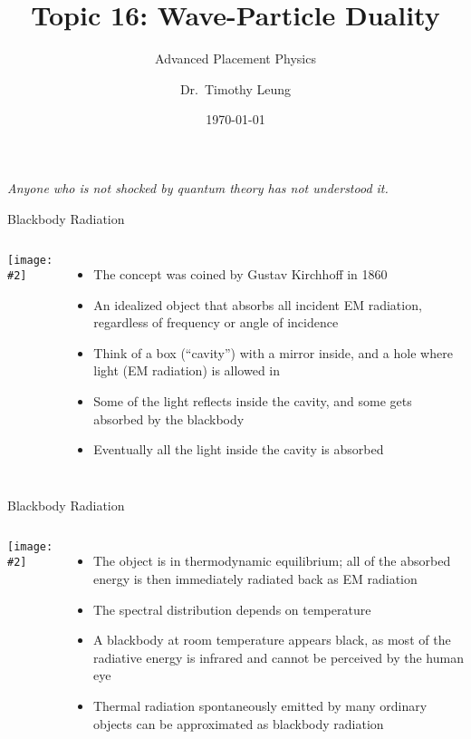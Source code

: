 \documentclass[12pt,compress,aspectratio=169]{beamer}
\title{Topic 16: Wave-Particle Duality}
\subtitle{Advanced Placement Physics}
\author[TML]{Dr.\ Timothy Leung}
\institute{Olympiads School}
\date{\today}
\newcommand{\pic}[2]{\texttt{[image: \#2]}}
\begin{document}
\begin{frame}
  \maketitle
\end{frame}


\begin{frame}{}
  \begin{center}
    \emph{Anyone who is not shocked by quantum theory has not understood it.}

    \vspace{.2in}
    \hspace{4in}{- Niels Bohr}
  \end{center}
\end{frame}



\begin{frame}{Blackbody Radiation}
  \begin{columns}
    \pic{1.3}{Black-body_realization}
     
    \begin{itemize}
    \item The concept was coined by Gustav Kirchhoff in 1860
    \item An idealized object that absorbs all incident EM radiation,
      regardless of frequency or angle of incidence
    \item Think of a box (``cavity'') with a mirror inside, and a hole where
      light (EM radiation) is allowed in
    \item Some of the light reflects inside the cavity, and some gets absorbed
      by the blackbody
    \item Eventually all the light inside the cavity is absorbed
    \end{itemize}
    \end{columns}
\end{frame}


\begin{frame}{Blackbody Radiation}
  \begin{columns}
    \pic{1.3}{Black-body_realization}
    
    \begin{itemize}
    \item The object is in thermodynamic equilibrium; all of the absorbed
      energy is then immediately radiated back as EM radiation
    \item The spectral distribution depends on temperature
    \item A blackbody at room temperature appears black, as most of the
      radiative energy is infrared and cannot be perceived by the human eye
    \item Thermal radiation spontaneously emitted by many ordinary objects can
      be approximated as blackbody radiation 
    \end{itemize}
  \end{columns}
\end{frame}
\end{document}
